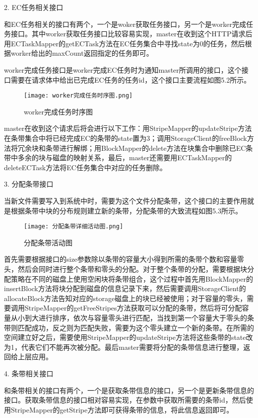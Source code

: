 2. EC任务相关接口

和EC任务相关的接口有两个，一个是woker获取任务接口，另一个是worker完成任务接口。其中worker获取任务接口比较容易实现，master在收到这个HTTP请求后用ECTaskMapper的getECTask方法在EC任务集合中寻找state为0的任务，然后根据worker给出的maxCount返回指定的任务即可。

worker完成任务接口是worker完成EC任务时为通知master所调用的接口，这个接口需要在请求体中给出已完成EC任务的任务id，这个接口主要流程如图5.2所示。

\begin{figure}[h]
  \centering
  \texttt{[image: worker完成任务时序图.png]}
  \caption{worker完成任务时序图}
\end{figure}

master在收到这个请求后将会进行以下工作：用StripeMapper的updateStripe方法在条带集合中将已经完成EC的条带的state置为3；调用StorageClient的freeBlock方法将冗余块和条带进行解绑；用BlockMapper的delete方法在块集合中删除已EC条带中多余的块与磁盘的映射关系，最后，master还需要用ECTaskMapper的deleteECTask方法将EC任务集合中对应的任务删除。

3. 分配条带接口

当新文件需要写入到系统中时，需要为这个文件分配条带，这个接口的主要作用就是根据条带中块的分布规则建立新的条带，分配条带的大致流程如图5.3所示。

\begin{figure}[h]
  \centering
  \texttt{[image: 分配条带详细活动图.png]}
  \caption{分配条带活动图}
\end{figure}

首先需要根据接口的size参数除以条带的容量大小得到所需的条带个数和容量零头，然后会同时进行整个条带和零头的分配。对于整个条带的分配，需要根据块分配策略在不同的磁盘上使用空闲块将条带组合，这个过程中首先用BlockMapper的insertBlock方法将块分配到磁盘的信息记录下来，然后需要调用StorageClient的allocateBlock方法告知对应的storage磁盘上的块已经被使用；对于容量的零头，需要调用StripeMapper的getFreeStripes方法获取可以分配的条带，然后将可分配容量从小到大进行排序，依次与容量零头进行匹配，当找到第一个容量大于零头的条带则匹配成功，反之则为匹配失败，需要为这个零头建立一个新的条带。在所需的空间建立好之后，需要使用StripeMapper的updateStripe方法将这些条带的state改为1，代表它们不能再次被分配。最后master需要将分配的条带信息进行整理，返回给上层应用。

4. 条带相关接口

和条带相关的接口有两个，一个是获取条带信息的接口，另一个是更新条带信息的接口。获取条带信息的接口相对容易实现，在参数中获取所需要的条带id，然后使用StripeMapper的getStripe方法即可获得条带的信息，将此信息返回即可。

